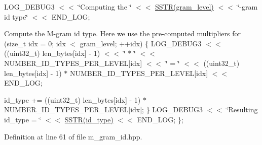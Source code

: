 L\+O\+G\+\_\+\+D\+E\+B\+U\+G3 $<$$<$ \char`\"{}\+Computing the \char`\"{} $<$$<$ \hyperlink{logger_8hpp_a0d2f37137ee1fd6ff4a0ef803849dd63}{S\+S\+T\+R(gram\+\_\+level)} $<$$<$ \char`\"{}-\/gram id type\char`\"{} $<$$<$ E\+N\+D\+\_\+\+L\+O\+G;

Compute the M-\/gram id type. Here we use the pre-\/computed multipliers for (size\+\_\+t idx = 0; idx $<$ gram\+\_\+level; ++idx) \{ L\+O\+G\+\_\+\+D\+E\+B\+U\+G3 $<$$<$ ((uint32\+\_\+t) len\+\_\+bytes\mbox{[}idx\mbox{]} -\/ 1) $<$$<$ \char`\"{} $\ast$ \char`\"{} $<$$<$ N\+U\+M\+B\+E\+R\+\_\+\+I\+D\+\_\+\+T\+Y\+P\+E\+S\+\_\+\+P\+E\+R\+\_\+\+L\+E\+V\+E\+L\mbox{[}idx\mbox{]} $<$$<$ \char`\"{} =  \char`\"{} $<$$<$ ((uint32\+\_\+t) len\+\_\+bytes\mbox{[}idx\mbox{]} -\/ 1) $\ast$ N\+U\+M\+B\+E\+R\+\_\+\+I\+D\+\_\+\+T\+Y\+P\+E\+S\+\_\+\+P\+E\+R\+\_\+\+L\+E\+V\+E\+L\mbox{[}idx\mbox{]} $<$$<$ E\+N\+D\+\_\+\+L\+O\+G;

id\+\_\+type += ((uint32\+\_\+t) len\+\_\+bytes\mbox{[}idx\mbox{]} -\/ 1) $\ast$ N\+U\+M\+B\+E\+R\+\_\+\+I\+D\+\_\+\+T\+Y\+P\+E\+S\+\_\+\+P\+E\+R\+\_\+\+L\+E\+V\+E\+L\mbox{[}idx\mbox{]}; \} L\+O\+G\+\_\+\+D\+E\+B\+U\+G3 $<$$<$ \char`\"{}\+Resulting id\+\_\+type = \char`\"{} $<$$<$ \hyperlink{logger_8hpp_a0d2f37137ee1fd6ff4a0ef803849dd63}{S\+S\+T\+R(id\+\_\+type)} $<$$<$ E\+N\+D\+\_\+\+L\+O\+G; \}; 

Definition at line 61 of file m\+\_\+gram\+\_\+id.\+hpp.

\hypertarget{classuva_1_1smt_1_1bpbd_1_1server_1_1lm_1_1m__grams_1_1m__gram__id_1_1_byte___m___gram___id_a3cd411cdeda61989f2061a4d7b4b5e2e}{}
